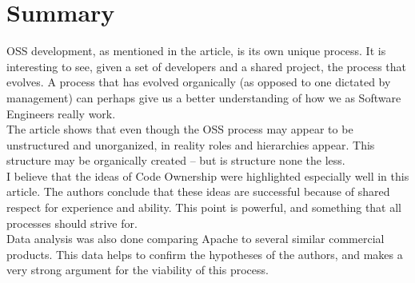 \documentclass{article}
\begin{document}
\section{Summary}
OSS development, as mentioned in the article, is its own unique process. It is interesting to see, given a set of developers and a shared project, the process that evolves. A process that has evolved organically (as opposed to one dictated by management) can perhaps give us a better understanding of how we as Software Engineers really work.\\
The article shows that even though the OSS process may appear to be unstructured and unorganized, in reality roles and hierarchies appear. This structure may be organically created -- but is structure none the less.\\
I believe that the ideas of Code Ownership were highlighted especially well in this article. The authors conclude that these ideas are successful because of shared respect for experience and ability. This point is powerful, and something that all processes should strive for.\\
Data analysis was also done comparing Apache to several similar commercial products. This data helps to confirm the hypotheses of the authors, and makes a very strong argument for the viability of this process.





  


\end{document}
